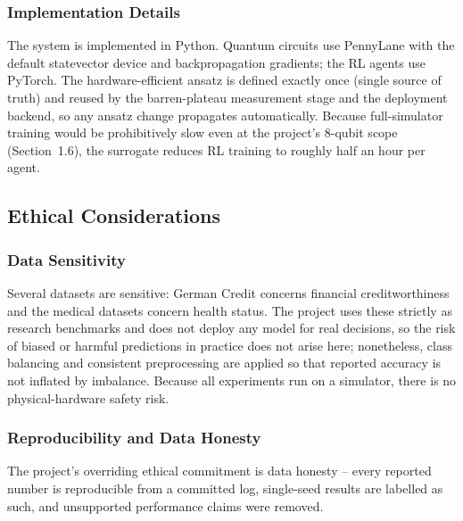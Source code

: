 \FloatBarrier
\subsubsection{Implementation Details}
The system is implemented in Python. Quantum circuits use PennyLane with the default statevector device and backpropagation gradients; the RL agents use PyTorch. The hardware-efficient ansatz is defined exactly once (single source of truth) and reused by the barren-plateau measurement stage and the deployment backend, so any ansatz change propagates automatically. Because full-simulator training would be prohibitively slow even at the project's 8-qubit scope (Section~1.6), the surrogate reduces RL training to roughly half an hour per agent.

\subsection{Ethical Considerations}

\subsubsection{Data Sensitivity}
Several datasets are sensitive: German Credit concerns financial creditworthiness and the medical datasets concern health status. The project uses these strictly as research benchmarks and does not deploy any model for real decisions, so the risk of biased or harmful predictions in practice does not arise here; nonetheless, class balancing and consistent preprocessing are applied so that reported accuracy is not inflated by imbalance. Because all experiments run on a simulator, there is no physical-hardware safety risk.

\subsubsection{Reproducibility and Data Honesty}
The project's overriding ethical commitment is data honesty -- every reported number is reproducible from a committed log, single-seed results are labelled as such, and unsupported performance claims were removed.

